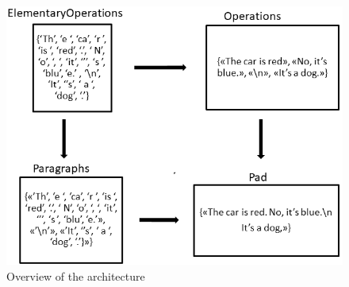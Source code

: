 \documentclass[a4, twocolumn, 12pt]{article}
\begin{document}
\begin{figure}
\centering
\includegraphics[scale=0.47]{figures/Archi.png}
\caption{Overview of the architecture}
\label{archi}
\end{figure}
\end{document}
